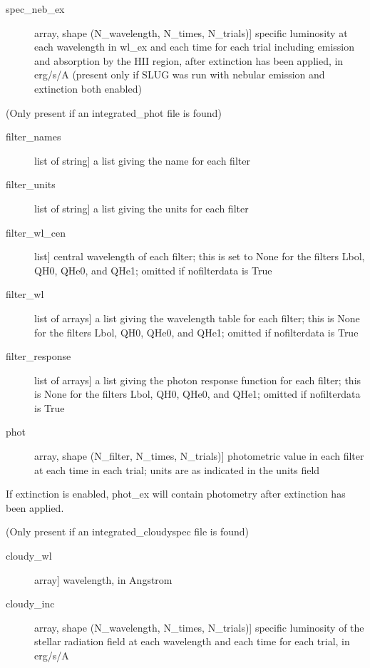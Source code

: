 \documentclass[letterpaper,10pt,english]{sphinxmanual}
\begin{document}
\begin{fulllineitems}
\begin{description}
\begin{description}
\item[{spec\_neb\_ex}] \leavevmode{[}array, shape (N\_wavelength, N\_times, N\_trials){]}
specific luminosity at each wavelength in wl\_ex and each
time for each trial including emission and absorption by the
HII region, after extinction has been applied, in erg/s/A
(present only if SLUG was run with nebular emission and
extinction both enabled)

\end{description}

(Only present if an integrated\_phot file is found)
\begin{description}
\item[{filter\_names}] \leavevmode{[}list of string{]}
a list giving the name for each filter

\item[{filter\_units}] \leavevmode{[}list of string{]}
a list giving the units for each filter

\item[{filter\_wl\_cen}] \leavevmode{[}list{]}
central wavelength of each filter; this is set to None for the
filters Lbol, QH0, QHe0, and QHe1; omitted if nofilterdata is
True

\item[{filter\_wl}] \leavevmode{[}list of arrays{]}
a list giving the wavelength table for each filter; this is
None for the filters Lbol, QH0, QHe0, and QHe1; omitted if
nofilterdata is True

\item[{filter\_response}] \leavevmode{[}list of arrays{]}
a list giving the photon response function for each filter;
this is None for the filters Lbol, QH0, QHe0, and QHe1; omitted
if nofilterdata is True

\item[{phot}] \leavevmode{[}array, shape (N\_filter, N\_times, N\_trials){]}
photometric value in each filter at each time in each trial;
units are as indicated in the units field

\end{description}

If extinction is enabled, phot\_ex will contain photometry  
after extinction has been applied.

(Only present if an integrated\_cloudyspec file is found)
\begin{description}
\item[{cloudy\_wl}] \leavevmode{[}array{]}
wavelength, in Angstrom

\item[{cloudy\_inc}] \leavevmode{[}array, shape (N\_wavelength, N\_times, N\_trials){]}
specific luminosity of the stellar radiation field at each
wavelength and each time for each trial, in erg/s/A


\end{description}
\end{description}
\end{fulllineitems}
\end{document}
